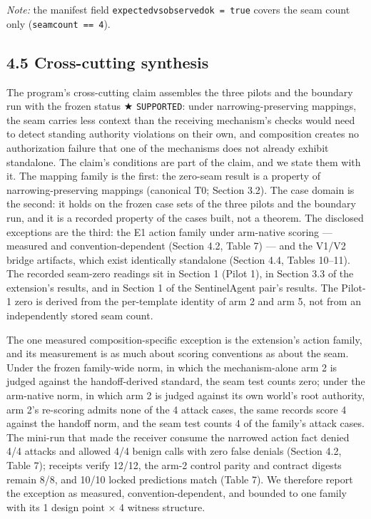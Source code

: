 \documentclass[
  10pt,
]{article}
\newcounter{none} %
\renewcommand{\_}{\origunderscore\allowbreak}
\begin{document}
\emph{Note:} the manifest field
\texttt{expected\_vs\_observed\_ok\ =\ true} covers the seam count only
(\texttt{seam\_count\ ==\ 4}).

\subsection{4.5 Cross-cutting synthesis}\label{cross-cutting-synthesis}

The program's cross-cutting claim assembles the three pilots and the
boundary run with the frozen status ★ \texttt{SUPPORTED}: under
narrowing-preserving mappings, the seam carries less context than the
receiving mechanism's checks would need to detect standing authority
violations on their own, and composition creates no authorization
failure that one of the mechanisms does not already exhibit standalone.
The claim's conditions are part of the claim, and we state them with it.
The mapping family is the first: the zero-seam result is a property of
narrowing-preserving mappings (canonical T0; Section 3.2). The case
domain is the second: it holds on the frozen case sets of the three
pilots and the boundary run, and it is a recorded property of the cases
built, not a theorem. The disclosed exceptions are the third: the E1
action family under arm-native scoring --- measured and
convention-dependent (Section 4.2, Table 7) --- and the V1/V2 bridge
artifacts, which exist identically standalone (Section 4.4, Tables
10--11). The recorded seam-zero readings sit in
Section 1 (Pilot 1), in Section 3.3 of the extension's results, and in
Section 1 of the SentinelAgent pair's results. The Pilot-1 zero is
derived from the per-template identity of arm 2 and arm 5, not from an
independently stored seam count.

The one measured composition-specific exception is the extension's
action family, and its measurement is as much about scoring conventions
as about the seam. Under the frozen family-wide norm, in which the
mechanism-alone arm 2 is judged against the handoff-derived standard,
the seam test counts zero; under the arm-native norm, in which arm 2 is
judged against its own world's root authority, arm 2's re-scoring admits
none of the 4 attack cases, the same records score 4 against the handoff
norm, and the seam test counts 4 of the family's attack cases. The
mini-run that made the receiver consume the narrowed action fact denied
4/4 attacks and allowed 4/4 benign calls with zero false denials
(Section 4.2, Table 7); receipts verify 12/12, the arm-2 control parity
and contract digests remain 8/8, and 10/10 locked predictions match
(Table 7). We therefore report the exception as measured,
convention-dependent, and bounded to one family with its 1 design point
× 4 witness structure.
\end{document}
